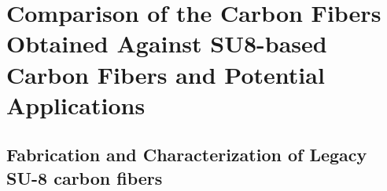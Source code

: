 
\chapter{Comparison of the Carbon Fibers Obtained Against SU8-based Carbon Fibers and Potential Applications} %

\label{Chapter:7}

\section{Fabrication and Characterization of Legacy SU-8 carbon fibers}


